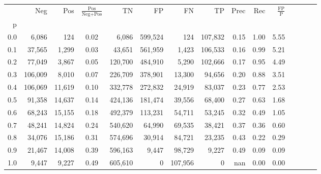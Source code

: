 \begin{tabular}{rrrcrrrrrrrrrrr}
\toprule
{} &      Neg &     Pos & $\frac{\text{Pos}}{\text{Neg}+\text{Pos}}$ &       TN &       FP &       FN &       TP &  Prec &   Rec & $\frac{\text{FP}}{\text{P}}$ \\
p   &          &         &                                            &          &          &          &          &       &       &                              \\
\midrule
0.0 &    6,086 &     124 &                                       0.02 &    6,086 &  599,524 &      124 &  107,832 &  0.15 &  1.00 &                         5.55 \\
0.1 &   37,565 &   1,299 &                                       0.03 &   43,651 &  561,959 &    1,423 &  106,533 &  0.16 &  0.99 &                         5.21 \\
0.2 &   77,049 &   3,867 &                                       0.05 &  120,700 &  484,910 &    5,290 &  102,666 &  0.17 &  0.95 &                         4.49 \\
0.3 &  106,009 &   8,010 &                                       0.07 &  226,709 &  378,901 &   13,300 &   94,656 &  0.20 &  0.88 &                         3.51 \\
0.4 &  106,069 &  11,619 &                                       0.10 &  332,778 &  272,832 &   24,919 &   83,037 &  0.23 &  0.77 &                         2.53 \\
0.5 &   91,358 &  14,637 &                                       0.14 &  424,136 &  181,474 &   39,556 &   68,400 &  0.27 &  0.63 &                         1.68 \\
0.6 &   68,243 &  15,155 &                                       0.18 &  492,379 &  113,231 &   54,711 &   53,245 &  0.32 &  0.49 &                         1.05 \\
0.7 &   48,241 &  14,824 &                                       0.24 &  540,620 &   64,990 &   69,535 &   38,421 &  0.37 &  0.36 &                         0.60 \\
0.8 &   34,076 &  15,186 &                                       0.31 &  574,696 &   30,914 &   84,721 &   23,235 &  0.43 &  0.22 &                         0.29 \\
0.9 &   21,467 &  14,008 &                                       0.39 &  596,163 &    9,447 &   98,729 &    9,227 &  0.49 &  0.09 &                         0.09 \\
1.0 &    9,447 &   9,227 &                                       0.49 &  605,610 &        0 &  107,956 &        0 &   nan &  0.00 &                         0.00 \\
\bottomrule
\end{tabular}
